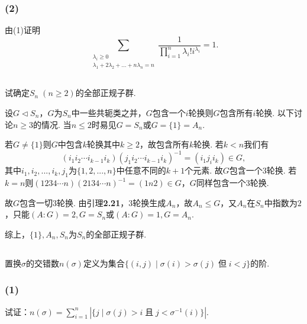 \subsubsection{(2)}
由(1)证明
$$\sum_{\substack{\lambda_i\geq 0\\\lambda_1+2\lambda_2+...+n\lambda_n=n}}\frac{1}{\prod_{i=1}^{n}\lambda_i!i^{\lambda_i}}=1.$$


\subsection{}
试确定$S_n\;(n\geq 2)$的全部正规子群.

\jie
设$G\vartriangleleft S_n$，$G$为$S_n$中一些共轭类之并，$G$包含一个$i$轮换则$G$包含所有$i$轮换. 以下讨论$n\geq 3$的情况. 当$n\leq 2$时易见$G=S_n$或$G=\{1\}=A_n$.

若$G\neq \{1\}$则$G$中包含$k$轮换其中$k\geq 2$，故包含所有$k$轮换. 若$k<n$我们有
$$(i_1i_2\cdots i_{k-1}i_k)(j_1i_2\cdots i_{k-1}i_k)^{-1}=(i_1j_ii_k)\in G,$$
其中$i_1, i_2, ..., i_k, j_1$为$\{1,2,...,n\}$中任意不同的$k+1$个元素. 故$G$包含一个$3$轮换.
若$k=n$则$(1234\cdots n)(2134\cdots n)^{-1}=(1n2)\in G$，$G$同样包含一个$3$轮换.

故$G$包含一切$3$轮换. 由{\heiti 引理}\textbf{2.21}，$3$轮换生成$A_n$，故$A_n\leq G$，又$A_n$在$S_n$中指数为$2$，只能$(A:G)=2, G=S_n$或$(A:G)=1, G=A_n$.

综上，$\{1\}, A_n, S_n$为$S_n$的全部正规子群.

\subsection{}
置换$\sigma$的交错数$n(\sigma)$定义为集合$\{(i,j)\mid\sigma(i)>\sigma(j)\;\text{但}\;i<j\}$的阶.
\subsubsection{(1)}
试证：$n(\sigma)=\sum_{i=1}^n\left|\{j\mid\sigma(j)>i\;\text{且}\;j<\sigma^{-1}(i)\}\right|$.


